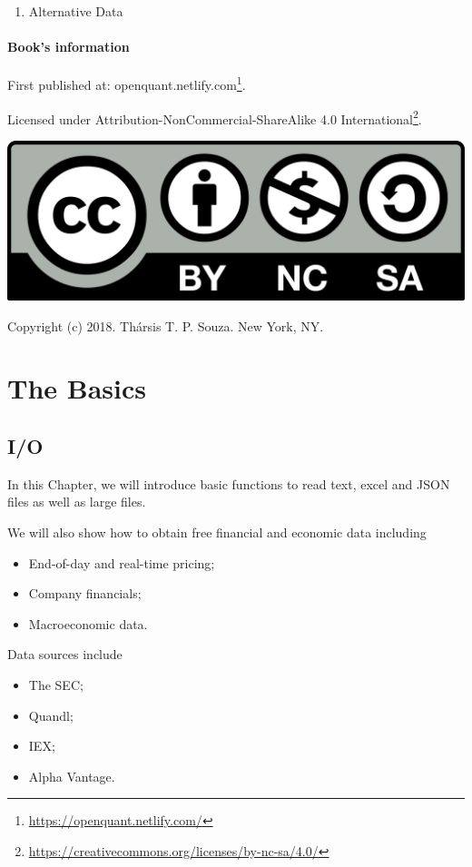 \documentclass[]{book}
\DeclareRobustCommand{\href}[2]{#2\footnote{\url{#1}}}
\providecommand{\tightlist}{%
  \setlength{\itemsep}{0pt}\setlength{\parskip}{0pt}}
\theoremstyle{definition}
\theoremstyle{definition}
\theoremstyle{definition}
\theoremstyle{remark}
\let\BeginKnitrBlock\begin \let\EndKnitrBlock\end
\begin{document}
\begin{enumerate}
\def\labelenumi{\arabic{enumi}.}
\setcounter{enumi}{5}
\tightlist
\item
  Alternative Data
\end{enumerate}

\subsection*{Book's information}\label{books-information}


First published at:
\href{https://openquant.netlify.com/}{openquant.netlify.com}.

Licensed under
\href{https://creativecommons.org/licenses/by-nc-sa/4.0/}{Attribution-NonCommercial-ShareAlike
4.0 International}.

\includegraphics[width=0.15\linewidth]{fig/by-nc-sa}

\BeginKnitrBlock{flushright}
Copyright (c) 2018. Thársis T. P. Souza. New York, NY.
\EndKnitrBlock{flushright}

\part{The Basics}\label{part-the-basics}

\chapter{I/O}\label{io}

In this Chapter, we will introduce basic functions to read text, excel
and JSON files as well as large files.

We will also show how to obtain free financial and economic data
including

\begin{itemize}
\tightlist
\item
  End-of-day and real-time pricing;
\item
  Company financials;
\item
  Macroeconomic data.
\end{itemize}

Data sources include

\begin{itemize}
\tightlist
\item
  The SEC;
\item
  Quandl;
\item
  IEX;
\item
  Alpha Vantage.
\end{itemize}
\end{document}
